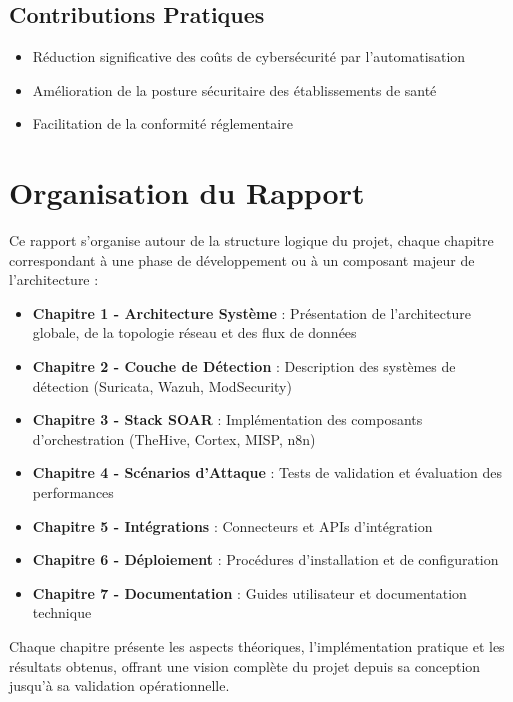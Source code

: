 \subsection{Contributions Pratiques}

\begin{itemize}
    \item Réduction significative des coûts de cybersécurité par l'automatisation
    \item Amélioration de la posture sécuritaire des établissements de santé
    \item Facilitation de la conformité réglementaire
\end{itemize}

\section{Organisation du Rapport}

Ce rapport s'organise autour de la structure logique du projet, chaque chapitre correspondant à une phase de développement ou à un composant majeur de l'architecture :

\begin{itemize}
    \item \textbf{Chapitre 1 - Architecture Système} : Présentation de l'architecture globale, de la topologie réseau et des flux de données
    \item \textbf{Chapitre 2 - Couche de Détection} : Description des systèmes de détection (Suricata, Wazuh, ModSecurity)
    \item \textbf{Chapitre 3 - Stack SOAR} : Implémentation des composants d'orchestration (TheHive, Cortex, MISP, n8n)
    \item \textbf{Chapitre 4 - Scénarios d'Attaque} : Tests de validation et évaluation des performances
    \item \textbf{Chapitre 5 - Intégrations} : Connecteurs et APIs d'intégration
    \item \textbf{Chapitre 6 - Déploiement} : Procédures d'installation et de configuration
    \item \textbf{Chapitre 7 - Documentation} : Guides utilisateur et documentation technique
\end{itemize}

Chaque chapitre présente les aspects théoriques, l'implémentation pratique et les résultats obtenus, offrant une vision complète du projet depuis sa conception jusqu'à sa validation opérationnelle.

\newpage
